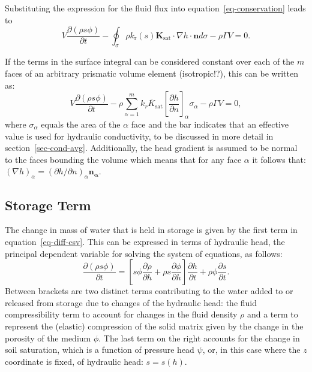 \documentclass[fleqn]{article}
\begin{document}
Substituting the expression for the fluid flux into equation~\ref{eq-conservation}
leads to
\begin{equation}
  V \frac{\partial (\rho s \phi)}{\partial t} -
  \oint_\sigma \rho k_\text{r}(s) \mathbf{K}_{\textrm{sat}}
  \cdot \nabla h \cdot \mathbf{n} d\sigma -
  \rho \Gamma V = 0.
\end{equation}

If the terms in the surface integral can be considered constant over each of the 
$m$ faces of an arbitrary prismatic volume element (isotropic!?), 
this can be written as:
\begin{equation}
  V \frac{\partial (\rho s \phi)}{\partial t} -
  \rho \sum_{\alpha=1}^{m} \overline{k_r K_{\textrm{sat}}}
  \left[\frac{\partial h}{\partial n}\right]_\alpha \sigma_\alpha -
  \rho \Gamma V = 0,
  \label{eq-diff-csv}
\end{equation}
where $\sigma_\alpha$ equals the area of the $\alpha$ face and the bar indicates 
that an effective value is used for hydraulic conductivity, to be discussed 
in more detail in section~\ref{sec-cond-avg}. Additionally, the head 
gradient is assumed to be normal to the faces bounding the volume which
means that for any face $\alpha$ it follows that:
$(\nabla h)_\alpha = (\partial h/\partial n)_\alpha \mathbf{n_\alpha}$.

\subsection{Storage Term}
The change in mass of water that is held in storage is given by the first 
term in equation~\ref{eq-diff-csv}. This can be expressed in terms of hydraulic
head, the principal dependent variable for solving the system of equations,
as follows:
\begin{equation}
  \frac{\partial (\rho s \phi)}{\partial t} =
  \left[
    s \phi \frac{\partial \rho}{\partial h} +
    \rho s \frac{\partial \phi}{\partial h}
    \right]
  \frac{\partial h}{\partial t} +  
  \rho \phi \frac{\partial s}{\partial t}.
  \label{eq-sto-terms}
\end{equation}
Between brackets are two distinct terms contributing to the water
added to or released from storage due to changes of the hydraulic
head: the fluid compressibility term to account for changes in the
fluid density $\rho$ and a term to represent the (elastic)
compression of the solid matrix given by the change in the porosity
of the medium $\phi$. The last term on the right accounts for the
change in soil saturation, which is a function of pressure head $\psi$, 
or, in this case where the $z$ coordinate is fixed, of hydraulic 
head: $s = s(h)$.
\end{document}
